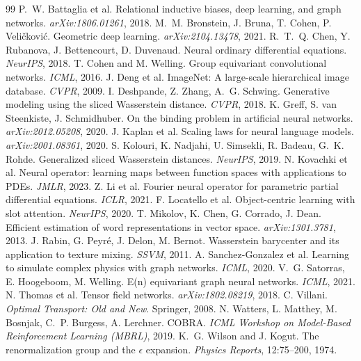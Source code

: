 \documentclass[11pt]{article}
\begin{document}
\begin{thebibliography}{99}
 P.~W. Battaglia et al. Relational inductive biases, deep learning, and graph networks. \emph{arXiv:1806.01261}, 2018.
 M.~M. Bronstein, J. Bruna, T. Cohen, P. Veli\v{c}kovi\'c. Geometric deep learning. \emph{arXiv:2104.13478}, 2021.
 R.~T.~Q. Chen, Y. Rubanova, J. Bettencourt, D. Duvenaud. Neural ordinary differential equations. \emph{NeurIPS}, 2018.
 T. Cohen and M. Welling. Group equivariant convolutional networks. \emph{ICML}, 2016.
 J. Deng et al. ImageNet: A large-scale hierarchical image database. \emph{CVPR}, 2009.
 I. Deshpande, Z. Zhang, A.~G. Schwing. Generative modeling using the sliced Wasserstein distance. \emph{CVPR}, 2018.
 K. Greff, S. van Steenkiste, J. Schmidhuber. On the binding problem in artificial neural networks. \emph{arXiv:2012.05208}, 2020.
 J. Kaplan et al. Scaling laws for neural language models. \emph{arXiv:2001.08361}, 2020.
 S. Kolouri, K. Nadjahi, U. Simsekli, R. Badeau, G.~K. Rohde. Generalized sliced Wasserstein distances. \emph{NeurIPS}, 2019.
 N. Kovachki et al. Neural operator: learning maps between function spaces with applications to PDEs. \emph{JMLR}, 2023.
 Z. Li et al. Fourier neural operator for parametric partial differential equations. \emph{ICLR}, 2021.
 F. Locatello et al. Object-centric learning with slot attention. \emph{NeurIPS}, 2020.
 T. Mikolov, K. Chen, G. Corrado, J. Dean. Efficient estimation of word representations in vector space. \emph{arXiv:1301.3781}, 2013.
 J. Rabin, G. Peyr\'e, J. Delon, M. Bernot. Wasserstein barycenter and its application to texture mixing. \emph{SSVM}, 2011.
 A. Sanchez-Gonzalez et al. Learning to simulate complex physics with graph networks. \emph{ICML}, 2020.
 V.~G. Satorras, E. Hoogeboom, M. Welling. E(n) equivariant graph neural networks. \emph{ICML}, 2021.
 N. Thomas et al. Tensor field networks. \emph{arXiv:1802.08219}, 2018.
 C. Villani. \emph{Optimal Transport: Old and New}. Springer, 2008.
 N. Watters, L. Matthey, M. Bosnjak, C.~P. Burgess, A. Lerchner. COBRA. \emph{ICML Workshop on Model-Based Reinforcement Learning (MBRL)}, 2019.
 K.~G. Wilson and J. Kogut. The renormalization group and the $\epsilon$ expansion. \emph{Physics Reports}, 12:75--200, 1974.
\end{thebibliography}
\end{document}
